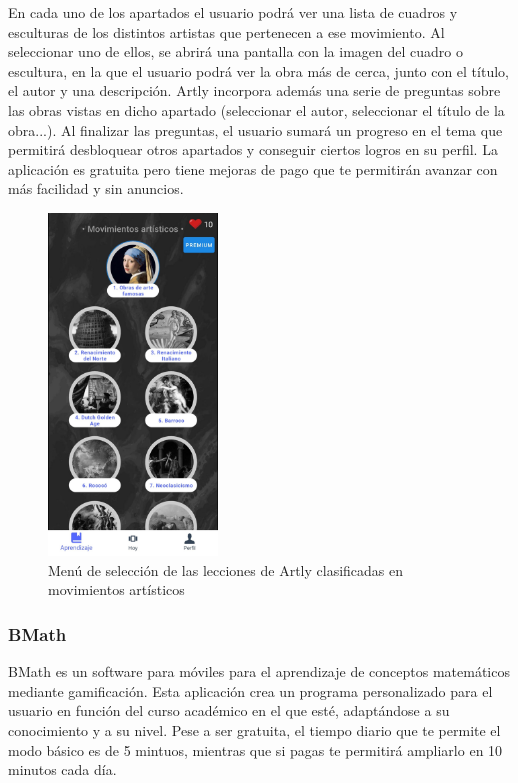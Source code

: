 En cada uno de los apartados el usuario podrá ver una lista de cuadros y esculturas de los distintos artistas que pertenecen a ese movimiento.
Al seleccionar uno de ellos, se abrirá una pantalla con la imagen del cuadro o escultura, en la que el usuario podrá ver la obra más de cerca, junto
con el título, el autor y una descripción. 
Artly incorpora además una serie de preguntas sobre las obras vistas en dicho apartado (seleccionar el autor, seleccionar el título de la obra...). 
Al finalizar las preguntas, el usuario sumará un progreso en el tema que permitirá desbloquear otros apartados y conseguir ciertos logros en su perfil.
La aplicación es gratuita pero tiene mejoras de pago que te permitirán avanzar con más facilidad y sin anuncios.

\begin{figure}[H]

    \centering
    \includegraphics[width=0.4\textwidth]{imagenes/c2/artly.jpeg}
    \caption{Menú de selección de las lecciones de Artly clasificadas en movimientos artísticos}
    \label{fig:artly}

\end{figure}



\subsubsection{BMath}
BMath es un software para móviles para el aprendizaje de conceptos matemáticos mediante gamificación. Esta aplicación crea un programa personalizado para el
usuario en función del curso académico en el que esté, adaptándose a su conocimiento y a su nivel. Pese a ser gratuita, el tiempo diario que te permite el
modo básico es de 5 mintuos, mientras que si pagas te permitirá ampliarlo en 10 minutos cada día. 

